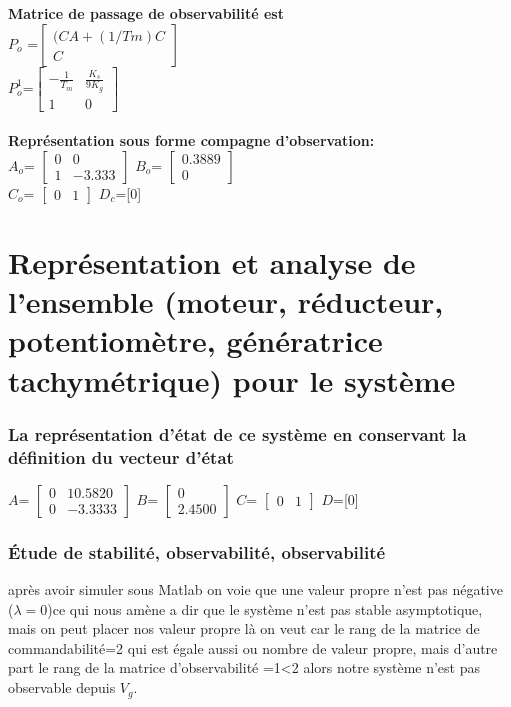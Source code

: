 \textbf{Matrice de passage de observabilité est}\\


$P_o$ =$
\begin{bmatrix}
(CA + (1/Tm)C\\ C
\end{bmatrix}$
\\

$P_o^1$=$\begin{bmatrix}
-\frac{1}{T_m}&\frac{K_s}{9K_g}\\
1&0
\end{bmatrix}$
\\\\

\textbf{Représentation sous forme compagne d'observation:}\\

$A_o$=
$\begin{bmatrix} 
0 & 0 \\
1 & -3.333
\end{bmatrix}$
\quad
$B_o$=
$\begin{bmatrix} 
0.3889 \\
0  
\end{bmatrix}$
$$
$$
$C_o$=
$\begin{bmatrix} 
0 & 1 
\end{bmatrix}$
\quad
$D_c$=[0]

\section{Représentation et analyse de l’ensemble (moteur, réducteur, potentiomètre, génératrice
tachymétrique) pour le système }
\subsubsection{La représentation d’état de ce système en conservant la définition du vecteur d’état }


$A$=
$\begin{bmatrix} 
0 & 10.5820 \\
0 & -3.3333
\end{bmatrix}$
\quad
$B$=
$\begin{bmatrix} 
0 \\
2.4500  
\end{bmatrix}$
\quad
$C$=
$\begin{bmatrix} 
0 & 1 
\end{bmatrix}$
\quad
$D$=[0]

\subsubsection{Étude de stabilité, observabilité, observabilité}
après avoir  simuler sous Matlab on voie que une valeur propre  n'est pas négative ($\lambda=0$)ce qui nous amène a dir que le système n'est pas stable asymptotique, mais on peut placer nos valeur propre là on veut car le rang de la matrice de commandabilité=2 qui est égale aussi ou nombre de valeur propre, mais d'autre part le rang de la matrice d’observabilité =1<2  alors notre système n'est pas observable depuis    
$V_g$.